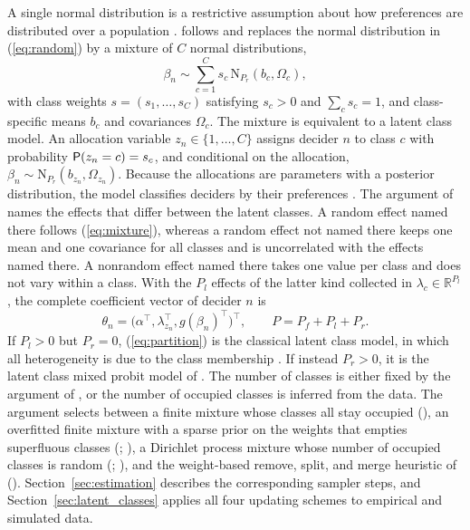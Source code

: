 \documentclass[article,shortnames]{jss}
\newcommand{\fct}[1]{\code{#1()}}
\begin{document}
A single normal distribution is a restrictive assumption about how preferences
are distributed over a population \citep[Section~6.2]{Train2009}. 
follows \citet{Oelschlaeger2021} and replaces the normal distribution in
(\ref{eq:random}) by a mixture of $C$ normal distributions,
%
\begin{equation}
  \label{eq:mixture}
  \beta_n \sim \sum_{c = 1}^{C} s_c\, \mathrm{N}_{P_r}(b_c, \Omega_c),
\end{equation}
%
with class weights $s = (s_1, \dots, s_C)$ satisfying $s_c > 0$ and
$\sum_c s_c = 1$, and class-specific means $b_c$ and covariances $\Omega_c$. The
mixture is equivalent to a latent class model. An allocation variable
$z_n \in \{1, \dots, C\}$ assigns decider $n$ to class $c$ with probability
$\mathsf{P}(z_n = c) = s_c$, and conditional on the allocation, $\beta_n \sim
\mathrm{N}_{P_r}(b_{z_n}, \Omega_{z_n})$. Because the allocations are parameters
with a posterior distribution, the model classifies deciders by their
preferences \citep{Oelschlaeger2026c}. The argument 
of \fct{fit} names the effects that differ between the latent classes. A random
effect named there follows (\ref{eq:mixture}), whereas a random effect
not named there keeps one mean and one covariance for all classes and is
uncorrelated with the effects named there. A nonrandom
effect named there takes one value per class and does not vary within a class.
With the $P_l$ effects of the latter kind collected in
$\lambda_c \in \mathbb{R}^{P_l}$, the complete coefficient vector of decider $n$
is
%
\begin{equation}
  \label{eq:partition}
  \theta_n = \big(\alpha^\top, \lambda_{z_n}^\top, g(\beta_n)^\top\big)^\top,
  \qquad P = P_f + P_l + P_r.
\end{equation}
%
If $P_l > 0$ but $P_r = 0$, (\ref{eq:partition}) is the classical latent class
model, in which all heterogeneity is due to the class membership
\citep{Kamakura1989, Greene2003}. If instead $P_r > 0$, it is the latent class
mixed probit model of \citet{Oelschlaeger2021}. The number of classes is either
fixed by the argument  of \fct{fit}, or the number of occupied
classes is inferred from the data. The argument  selects
between a finite mixture whose classes all stay occupied (), an
overfitted finite mixture with a sparse prior on the weights that empties
superfluous classes (;
\citealp{Rousseau2011, MalsinerWalli2016, FruehwirthSchnatter2019}), a Dirichlet
process mixture whose number of occupied classes is random
(; \citealp{Escobar1995, Neal2000}), and the
weight-based remove, split, and merge heuristic of \citet{Oelschlaeger2021}
(). Section~\ref{sec:estimation} describes the
corresponding sampler steps, and Section~\ref{sec:latent_classes} applies all
four updating schemes to empirical and simulated data.
\end{document}

